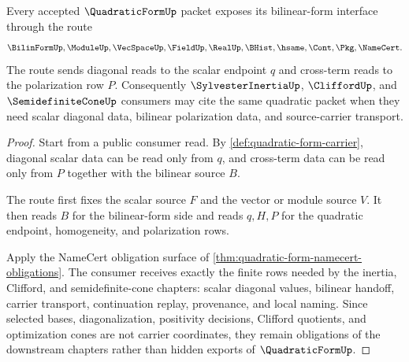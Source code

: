 \begin{theorem}
\label{thm:quadratic-form-bilinear-form-handoff}
Every accepted $\QuadraticFormUp$ packet exposes its bilinear-form interface through the route
$$
\BilinFormUp,\ModuleUp,\VecSpaceUp,\FieldUp,\RealUp,\BHist,\hsame,\Cont,\Pkg,\NameCert .
$$
The route sends diagonal reads to the scalar endpoint $q$ and cross-term reads to the polarization row $P$. Consequently $\SylvesterInertiaUp$, $\CliffordUp$, and $\SemidefiniteConeUp$ consumers may cite the same quadratic packet when they need scalar diagonal data, bilinear polarization data, and source-carrier transport.
\end{theorem}
\begin{proof}
Start from a public consumer read. By \autoref{def:quadratic-form-carrier}, diagonal scalar data can be read only from $q$, and cross-term data can be read only from $P$ together with the bilinear source $B$.

The route first fixes the scalar source $F$ and the vector or module source $V$. It then reads $B$ for the bilinear-form side and reads $q,H,P$ for the quadratic endpoint, homogeneity, and polarization rows.

Apply the NameCert obligation surface of \autoref{thm:quadratic-form-namecert-obligations}. The consumer receives exactly the finite rows needed by the inertia, Clifford, and semidefinite-cone chapters: scalar diagonal values, bilinear handoff, carrier transport, continuation replay, provenance, and local naming. Since selected bases, diagonalization, positivity decisions, Clifford quotients, and optimization cones are not carrier coordinates, they remain obligations of the downstream chapters rather than hidden exports of $\QuadraticFormUp$.
\end{proof}


\begin{closurestatus}{\QuadraticFormUp}
  \theoryclosure{\seedClosure}
  \formalstatus{\unformalizedV}
\end{closurestatus}

